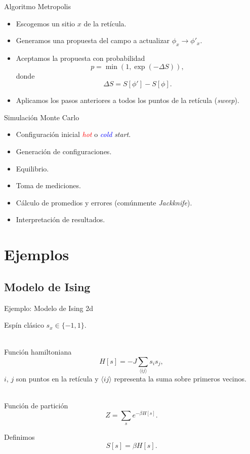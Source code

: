 \documentclass[11pt]{beamer}
\begin{document}
\begin{frame}{Algoritmo Metropolis}
    \begin{itemize}
        \item Escogemos un sitio $x$ de la retícula.
        \item Generamos una propuesta del campo a actualizar $\phi_x \to \phi'_x$.
        \item Aceptamos la propuesta con probabilidad 
        $$ p = \min\left(1, \exp\left(-\Delta S\right)\right),$$
           donde
        $$ \Delta S = S[\phi'] - S[\phi].$$        
      
      	\item Aplicamos los pasos anteriores a todos los puntos de la retícula (\emph{sweep}). 
    \end{itemize}
\end{frame}

\begin{frame}{Simulación Monte Carlo}

    \begin{itemize}
    		\item Configuración inicial \emph{\textcolor{red}{hot}} o \emph{\textcolor{blue}{cold}} \emph{start}.
        \item Generación de configuraciones.
        \item Equilibrio.
        \item Toma de mediciones.
        \item Cálculo de promedios y errores (comúnmente \emph{Jackknife}).
        \item Interpretación de resultados.
    \end{itemize}

\end{frame}

\section{Ejemplos}
\subsection{Modelo de Ising}
\begin{frame}{Ejemplo: Modelo de Ising 2d}

Espín clásico $s_x\in\{-1,1\}$. \\~

Función hamiltoniana
$$ H[s] = -J\sum_{\langle ij \rangle} s_i s_j,$$
$i$, $j$ son puntos en la retícula y $\langle ij \rangle$ representa la suma sobre primeros vecinos.\\~

Función de partición
$$ Z = \sum_s e^{-\beta H[s]}.$$

Definimos
$$S[s] = \beta H[s].$$

\end{frame}
\end{document}
